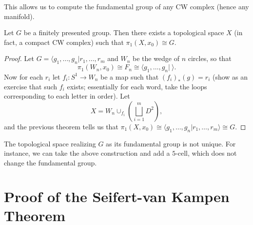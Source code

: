 \begin{remark}
  This allows us to compute the fundamental group
  of any CW complex (hence any manifold).
\end{remark}

\begin{corollary}
  Let $G$ be a finitely presented group. Then there
  exists a topological space $X$ (in fact, a compact
  CW complex) such that $\pi_1(X, x_0) \cong G$.
\end{corollary}

\begin{proof}
  Let $G = \langle g_1, \dots, g_n | r_1, \dots, r_m$
  and $W_n$ be the wedge of $n$ circles, so that
  \[
    \pi_1(W_n, x_0) \cong F_n \cong \langle g_1, \dots, g_n | \ \rangle.
  \]
  Now for each $r_i$ let $f_i : S^1 \to W_n$ be a
  map such that $(f_i)_*(g) = r_i$ (show as an exercise
  that such $f_i$ exists; essentially for each word,
  take the loops corresponding to each letter in order).
  Let
  \[
    X = W_n \cup_{f_i} \left(\bigsqcup_{i = 1}^m D^2\right),
  \]
  and the previous theorem tells us that
  $\pi_1(X, x_0) \cong \langle g_1, \dots, g_n | r_1, \dots, r_m \rangle \cong G$.
\end{proof}

\begin{remark}
  The topological space realizing $G$ as its
  fundamental group is not unique. For instance,
  we can take the above construction and add
  a $5$-cell, which does not change the fundamental
  group.
\end{remark}

\section{Proof of the Seifert-van Kampen Theorem}

